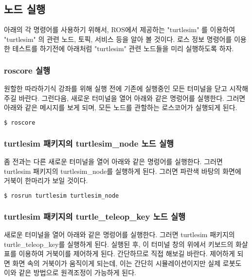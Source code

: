 \subsection{노드 실행}

아래의 각 명령어를 사용하기 위해서, ROS에서 제공하는 "turtlesim" 를 이용하여 "turtlesim" 의 관련 노드, 토픽, 서비스 등을 알아 볼 것이다. 로스 정보 명령어를 이용한 테스트를 하기전에 아래처럼 "turtlesim" 관련 노드들을 미리 실행하도록 하자.

\subsubsection{roscore 실행}

원할한 따라하기식 강좌를 위해 실행 전에 기존에 실행중인 모든 터미널을 닫고 시작해 주길 바란다. 그런다음, 새로운 터미널을 열어 아래와 같은 명렁어를 실행한다. 그러면 아래와 같은 메시지를 보게 되며, 모든 노드를 관할하는 로스코어가 실행되게 된다.

\begin{lstlisting}[language=bash]
$ roscore
\end{lstlisting}

\subsubsection{turtlesim 패키지의 turtlesim\_node 노드 실행}

좀 전과는 다른 새로운 터미널을 열어 아래와 같은 명렁어를 실행한다. 그러면 turtlesim 패키지의 turtlesim\_node를 실행하게 된다. 그러면 파란색 바탕의 화면에 거북이 한마리가 보일 것이다.

\begin{lstlisting}[language=bash]
$ rosrun turtlesim turtlesim_node 
\end{lstlisting}

\subsubsection{turtlesim 패키지의 turtle\_teleop\_key 노드 실행}

새로운 터미널을 열어 아래와 같은 명렁어를 실행한다. 그러면 turtlesim 패키지의 turtle\_teleop\_key를 실행하게 된다. 실행된 후, 이 터미널 창의 위에서 키보드의 화살표를 이용하여 거북이를 제어하게 된다. 간단하므로 직접 해보길 바란다. 제어하게 되면 화면 속의 거북이가 움직이게 되는데, 이는 간단히 시뮬레이션이지만 실제 로봇도 이와 같은 방법으로 원격조정이 가능하게 된다.

